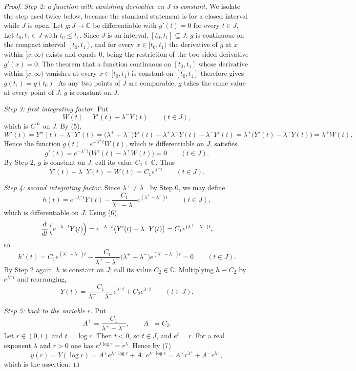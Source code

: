 \begin{proof}
\emph{Step 2: a function with vanishing derivative on $J$ is constant.}  We
isolate the step used twice below, because the standard statement is for a
closed interval while $J$ is open.  Let $g\colon J\to\mathbb{C}$ be
differentiable with $g'(t)=0$ for every $t\in J$.  Let $t_0,t_1\in J$ with
$t_0\le t_1$.  Since $J$ is an interval, $[t_0,t_1]\subseteq J$; $g$ is
continuous on the compact interval $[t_0,t_1]$, and for every $x\in[t_0,t_1)$
the derivative of $g$ at $x$ within $[x,\infty)$ exists and equals $0$, being
the restriction of the two-sided derivative $g'(x)=0$.  The theorem that a
function continuous on $[t_0,t_1]$ whose derivative within $[x,\infty)$
vanishes at every $x\in[t_0,t_1)$ is constant on $[t_0,t_1]$ therefore gives
$g(t_1)=g(t_0)$.  As any two points of $J$ are comparable, $g$ takes the same
value at every point of $J$: $g$ is constant on $J$.

\emph{Step 3: first integrating factor.}  Put
\[
  W(t)=Y'(t)-\lambda^{-}Y(t)\qquad(t\in J),
\]
which is $C^\infty$ on $J$.  By (5),
\[
  W'(t)=Y''(t)-\lambda^{-}Y'(t)
  =\bigl(\lambda^{+}+\lambda^{-}\bigr)Y'(t)-\lambda^{+}\lambda^{-}Y(t)-\lambda^{-}Y'(t)
  =\lambda^{+}\bigl(Y'(t)-\lambda^{-}Y(t)\bigr)=\lambda^{+}W(t).
\]
Hence the function $g(t)=e^{-\lambda^{+}t}W(t)$, which is differentiable on
$J$, satisfies
\[
  g'(t)=e^{-\lambda^{+}t}\bigl(W'(t)-\lambda^{+}W(t)\bigr)=0\qquad(t\in J).
\]
By Step 2, $g$ is constant on $J$; call its value $C_1\in\mathbb{C}$.  Thus
\begin{equation}\tag{6}
  Y'(t)-\lambda^{-}Y(t)=W(t)=C_1e^{\lambda^{+}t}\qquad(t\in J).
\end{equation}

\emph{Step 4: second integrating factor.}  Since $\lambda^{+}\neq\lambda^{-}$
by Step 0, we may define
\[
  h(t)=e^{-\lambda^{-}t}Y(t)-\frac{C_1}{\lambda^{+}-\lambda^{-}}
    e^{(\lambda^{+}-\lambda^{-})t}\qquad(t\in J),
\]
which is differentiable on $J$.  Using (6),
\[
  \frac{d}{dt}\Bigl(e^{-\lambda^{-}t}Y(t)\Bigr)
  =e^{-\lambda^{-}t}\bigl(Y'(t)-\lambda^{-}Y(t)\bigr)
  =C_1e^{(\lambda^{+}-\lambda^{-})t},
\]
so
\[
  h'(t)=C_1e^{(\lambda^{+}-\lambda^{-})t}
    -\frac{C_1}{\lambda^{+}-\lambda^{-}}\bigl(\lambda^{+}-\lambda^{-}\bigr)
      e^{(\lambda^{+}-\lambda^{-})t}=0\qquad(t\in J).
\]
By Step 2 again, $h$ is constant on $J$; call its value $C_2\in\mathbb{C}$.
Multiplying $h\equiv C_2$ by $e^{\lambda^{-}t}$ and rearranging,
\begin{equation}\tag{7}
  Y(t)=\frac{C_1}{\lambda^{+}-\lambda^{-}}e^{\lambda^{+}t}+C_2e^{\lambda^{-}t}
  \qquad(t\in J).
\end{equation}

\emph{Step 5: back to the variable $r$.}  Put
\[
  A^{+}=\frac{C_1}{\lambda^{+}-\lambda^{-}},\qquad A^{-}=C_2 .
\]
Let $r\in(0,1)$ and $t=\log r$.  Then $t<0$, so $t\in J$, and $e^{t}=r$.  For a
real exponent $\lambda$ and $r>0$ one has $e^{\lambda\log r}=r^{\lambda}$.
Hence by (7)
\[
  y(r)=Y(\log r)=A^{+}e^{\lambda^{+}\log r}+A^{-}e^{\lambda^{-}\log r}
  =A^{+}r^{\lambda^{+}}+A^{-}r^{\lambda^{-}},
\]
which is the assertion.
\end{proof}
